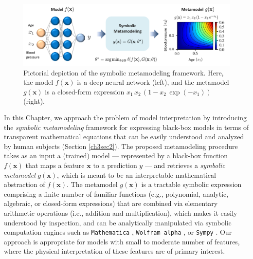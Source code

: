 \documentclass [PhD] {uclathes}
\begin{document}
\begin{figure}[t]
\centering
\includegraphics[width=6in]{ch3Fig1.pdf}
\caption{Pictorial depiction of the symbolic metamodeling framework. Here, the model $f(\boldsymbol{x})$ is a deep neural network (left), and the metamodel $g(\boldsymbol{x})$ is a closed-form expression $x_1\,x_2\,(1-x_2\,\exp(-x_1))$ (right).}
\label{ch3fig1} 
\end{figure}

In this Chapter, we approach the problem of model interpretation by introducing the \textit{symbolic metamodeling} framework for expressing black-box models in terms of transparent mathematical equations that can be easily understood and analyzed by human subjects (Section \ref{ch3sec2}). The proposed metamodeling procedure takes as an input a (trained) model --- represented by a black-box function $f(\boldsymbol{x})$ that maps a feature $\boldsymbol{x}$ to a prediction $y$ --- and retrieves a \textit{symbolic metamodel} $g(\boldsymbol{x})$, which is meant to be an interpretable mathematical abstraction of $f(\boldsymbol{x})$. The metamodel $g(\boldsymbol{x})$ is a tractable symbolic expression comprising a finite number of familiar functions (e.g., polynomial, analytic, algebraic, or closed-form expressions) that are combined via elementary arithmetic operations (i.e., addition and multiplication), which makes it easily understood by inspection, and can be analytically manipulated via symbolic computation engines such as {\footnotesize \texttt{Mathematica}} \cite{abell2017mathematica}, {\footnotesize \texttt{Wolfram alpha}} \cite{wolfram2013wolfram}, or {\footnotesize \texttt{Sympy}} \cite{10.7717/peerj-cs.103}. Our approach is appropriate for models with small to moderate number of features, where the physical interpretation of these features are of primary interest. 
\end{document}

